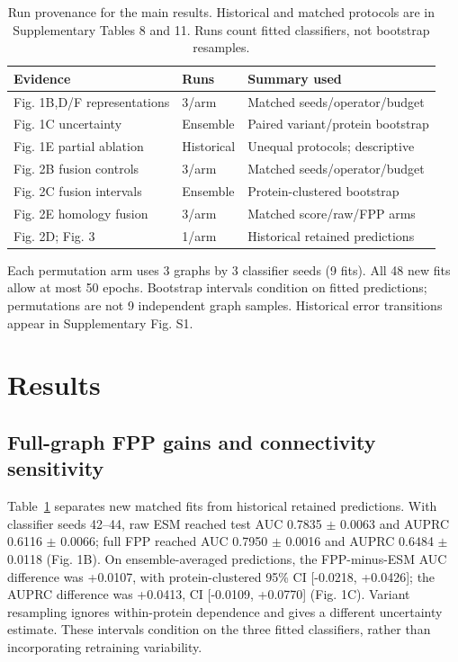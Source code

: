 \documentclass[conference]{IEEEtran}
\begin{document}
\begin{table}[t]
\caption{Run provenance for the main results. Historical and matched protocols are in Supplementary Tables 8 and 11. Runs count fitted classifiers, not bootstrap resamples.}
\label{tab:run_sources}
\centering
\footnotesize
\setlength{\tabcolsep}{3pt}
\renewcommand{\arraystretch}{1.12}
\begin{tabular}{p{}p{}p{}}
\hline
Evidence & Runs & Summary used \\
\hline
Fig. 1B,D/F representations & 3/arm & Matched seeds/operator/budget \\
Fig. 1C uncertainty & Ensemble & Paired variant/protein bootstrap \\
Fig. 1E partial ablation & Historical & Unequal protocols; descriptive \\
Fig. 2B fusion controls & 3/arm & Matched seeds/operator/budget \\
Fig. 2C fusion intervals & Ensemble & Protein-clustered bootstrap \\
Fig. 2E homology fusion & 3/arm & Matched score/raw/FPP arms \\
Fig. 2D; Fig. 3 & 1/arm & Historical retained predictions \\
\hline
\end{tabular}
\par\smallskip
\raggedright Each permutation arm uses 3 graphs by 3 classifier seeds (9 fits). All 48 new fits allow at most 50 epochs. Bootstrap intervals condition on fitted predictions; permutations are not 9 independent graph samples. Historical error transitions appear in Supplementary Fig. S1.
\end{table}

\section{Results}

\subsection{Full-graph FPP gains and connectivity sensitivity}

Table~\ref{tab:run_sources} separates new matched fits from historical retained predictions. With classifier seeds 42--44, raw ESM reached test AUC 0.7835 $\pm$ 0.0063 and AUPRC 0.6116 $\pm$ 0.0066; full FPP reached AUC 0.7950 $\pm$ 0.0016 and AUPRC 0.6484 $\pm$ 0.0118 (Fig. 1B). On ensemble-averaged predictions, the FPP-minus-ESM AUC difference was +0.0107, with protein-clustered 95\% CI [-0.0218, +0.0426]; the AUPRC difference was +0.0413, CI [-0.0109, +0.0770] (Fig. 1C). Variant resampling ignores within-protein dependence and gives a different uncertainty estimate. These intervals condition on the three fitted classifiers, rather than incorporating retraining variability.
\end{document}
